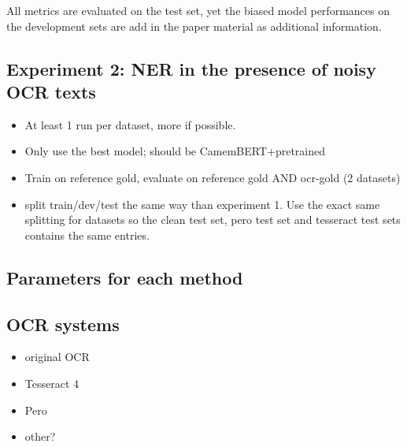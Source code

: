 All metrics are evaluated on the test set, yet the biased model performances on the development sets are add in the paper material as additional information.


\subsection{Experiment 2: NER in the presence of noisy OCR texts}

\begin{itemize}
\item At least 1 run per dataset, more if possible.
\item Only use the best model; should be CamemBERT+pretrained
\item Train on reference gold, evaluate on reference gold AND ocr-gold (2 datasets)
\item split train/dev/test the same way than experiment 1. Use the exact same splitting for datasets so the clean test set, pero test set and tesseract test sets contains the same entries.
\end{itemize}
 
 



\subsection{Parameters for each method}

\subsection{OCR systems}
\begin{itemize}
    \item original OCR
    \item Tesseract 4
    \item Pero
    \item other?
\end{itemize}

